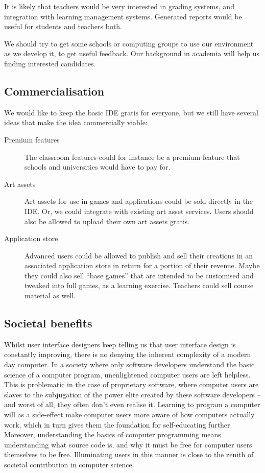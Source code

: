It is likely that teachers would be very interested in grading systems, and 
integration with learning management systems. Generated reports would be 
useful for students and teachers both.

We should try to get some schools or computing groups to use our environment 
as we develop it, to get useful feedback. Our background in academia will
help us finding interested candidates.

\subsection{Commercialisation}

We would like to keep the basic IDE gratis for everyone, but we still have
several ideas that make the idea commercially viable:

\begin{description}
  \item[Premium features]
    The classroom features could for instance be a premium feature that schools
    and universities would have to pay for.
  \item[Art assets]
    Art assets for use in games and applications could be sold directly in the
    IDE. Or, we could integrate with existing art asset services. Users should 
    also be allowed to upload their own art assets gratis.
  \item[Application store]
    Advanced users could be allowed to publish and sell their creations in an 
    associated application store in return for a portion of their revenue. 
    Maybe they could also sell ``base games'' that are intended to be 
    customised and tweaked into full games, as a learning exercise. Teachers 
    could sell course material as well.
\end{description}

\subsection{Societal benefits}
Whilst user interface designers keep telling us that user interface design is 
constantly improving, there is no denying the inherent complexity of a modern 
day computer. In a society where only software developers understand the basic 
science of a computer program, unenlightened computer users are left helpless. 
This is problematic in the case of proprietary software, where computer users 
are slaves to the subjugation of the power elite created by these software 
developers -- and worst of all, they often don't even realise it. Learning to 
program a computer will as a side-effect make computer users more aware of how 
computers actually work, which in turn gives them the foundation for 
self-educating further. Moreover, understanding the basics of computer 
programming means understanding what source code is, and why it must be free 
for computer users themselves to be free. Illuminating users in this manner is 
close to the zenith of societal contribution in computer science.

